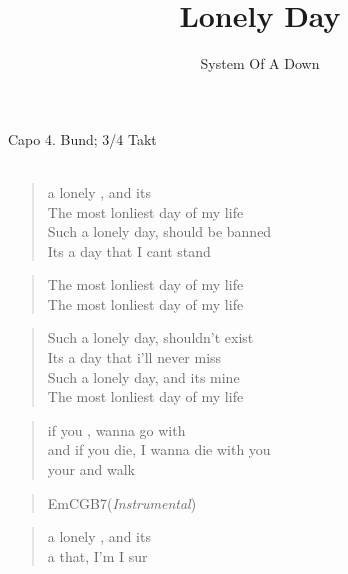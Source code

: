 \documentclass[12pt,a4paper,oneside, onecolumn]{article}
\author{System Of A Down}
\title{Lonely Day}
\date{}
\begin{document}
\maketitle
\thispagestyle{empty}

Capo 4. Bund; 3/4 Takt\\
\mbox{
}\\

\begin{verse}
 a lonely , and its \\
The most lonliest day of my life\\
Such a lonely day, should be banned\\
Its a day that I cant stand\\
\end{verse}

\begin{verse}
The most lonliest day of my life \\
The most lonliest day of my life \\
\end{verse}

\begin{verse}
Such a lonely day, shouldn't exist \\
Its a day that i'll never miss \\
Such a lonely day, and its mine\\
The most lonliest day of my life \\
\end{verse}

\begin{verse}
 if you ,  wanna go with  \\
and if you die, I wanna die with you \\
 your  and walk  \\
\end{verse}

\begin{verse}
Em\quad C\quad G\quad B7\quad (\textit{Instrumental})
\end{verse}

\begin{verse}
 a lonely , and its \\
 a  that, I'm  I sur\\
\end{verse}
\end{document}
